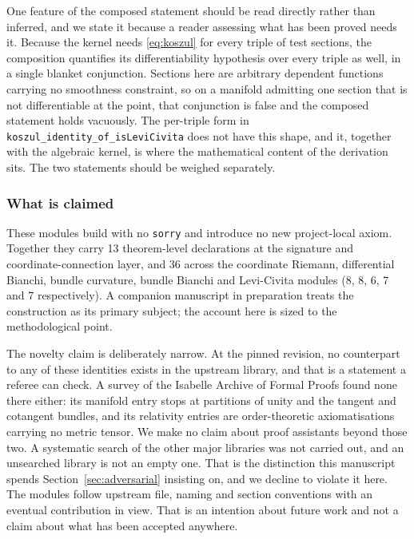 \documentclass[11pt]{article}
\providecommand{\phaseSixfWsevenTotal}{13}
\providecommand{\riemannCoordinateThms}{8}
\providecommand{\riemannDifferentialBianchiThms}{8}
\providecommand{\bundleRiemannAuxThms}{6}
\providecommand{\bundleRiemannThms}{7}
\providecommand{\leviCivitaThms}{7}
\providecommand{\phaseSixfWeightTotal}{36}
\begin{document}
One feature of the composed statement should be read directly rather
than inferred, and we state it because a reader assessing what has been
proved needs it. Because the kernel needs \eqref{eq:koszul} for every
triple of test sections, the composition quantifies its differentiability
hypothesis over every triple as well, in a single blanket conjunction.
Sections here are arbitrary dependent functions carrying no smoothness
constraint, so on a manifold admitting one section that is not
differentiable at the point, that conjunction is false and the composed
statement holds vacuously. The per-triple form in
\texttt{koszul\_identity\_of\_isLeviCivita} does not have this shape, and
it, together with the algebraic kernel, is where the mathematical content
of the derivation sits. The two statements should be weighed separately.

\subsubsection{What is claimed}

These modules build with no \texttt{sorry} and introduce no new
project-local axiom. Together they carry \phaseSixfWsevenTotal{}
theorem-level declarations at the signature and coordinate-connection
layer, and \phaseSixfWeightTotal{} across the coordinate Riemann,
differential Bianchi, bundle curvature, bundle Bianchi and Levi-Civita
modules (\riemannCoordinateThms{}, \riemannDifferentialBianchiThms{},
\bundleRiemannAuxThms{}, \bundleRiemannThms{} and \leviCivitaThms{}
respectively). A companion manuscript in preparation treats the
construction as its primary subject; the account here is sized to the
methodological point.

The novelty claim is deliberately narrow. At the pinned revision, no
counterpart to any of these identities exists in the upstream library,
and that is a statement a referee can check. A survey of the Isabelle
Archive of Formal Proofs found none there either: its manifold entry
stops at partitions of unity and the tangent and cotangent bundles, and
its relativity entries are order-theoretic axiomatisations carrying no
metric tensor. We make no claim about proof assistants beyond those two.
A systematic search of the other major libraries was not carried out,
and an unsearched library is not an empty one. That is the
distinction this manuscript spends Section~\ref{sec:adversarial}
insisting on, and we decline to violate it here.
The modules follow upstream file, naming and section conventions with an
eventual contribution in view. That is an intention about future work and
not a claim about what has been accepted anywhere.
\end{document}
